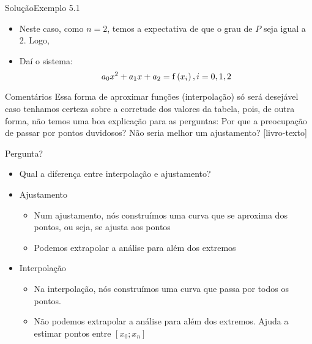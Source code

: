\begin{frame}{Solução}{Exemplo 5.1}
\begin{itemize}[<+->]
  \item Neste caso, como $n=2$, temos a expectativa de que o grau de $P$ seja igual a 2. Logo,\\
\action<+->{
\[
P\left(\x\right) = a_0 x^2 + a_1 x + a_2
\]
}
  \item Daí o sistema:
\[
a_0 x^2 + a_1 x + a_2 = \mathrm{f}\left(x_i\right), i = 0, 1, 2
\]
\begin{minipage}{0.45\textwidth}
\action<+->{
\[
\begin{cases}
a_0 - a_1 + a_2 &= -4 \\
a_0 + a_1 + a_2 &= -2 \\
4 a_0 + 2 a_1 + a_2 &= -10
\end{cases}
\]
}
\end{minipage}
\begin{minipage}{0.45\textwidth}

\end{minipage}
\end{itemize}
\end{frame}

\begin{frame}{Comentários}
Essa forma de aproximar funções (interpolação) só será desejável caso tenhamos certeza sobre a corretude dos valores da tabela, pois, de outra forma, não temos uma boa explicação para as perguntas: Por que a preocupação de passar por pontos duvidosos? Não seria melhor um ajustamento? [livro-texto]
\end{frame}

\begin{frame}{Pergunta?}
\begin{itemize}[<+->]
  \item Qual a diferença entre interpolação e ajustamento?
  \item Ajustamento
  \begin{itemize}[<+->]
    \item Num ajustamento, nós construímos uma curva que se aproxima dos pontos, ou seja, se ajusta aos pontos
    \item Podemos extrapolar a análise para além dos extremos
  \end{itemize}
  \item Interpolação
  \begin{itemize}
    \item Na interpolação, nós construímos uma curva que passa por todos os pontos.
    \item Não podemos extrapolar a análise para além dos extremos.  Ajuda a estimar pontos entre $[x_0; x_n]$
  \end{itemize}
\end{itemize}
\end{frame}

